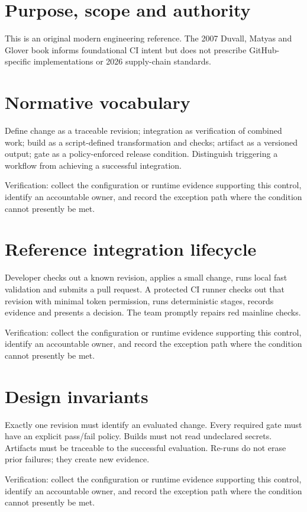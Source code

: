 \documentclass[11pt,letterpaper]{article}
\begin{document}
\makedoctitle
\makedocsummary
\tableofcontents
\clearpage
\section{Purpose, scope and authority}
This is an original modern engineering reference. The 2007 Duvall, Matyas and Glover book informs foundational CI intent but does not prescribe GitHub-specific implementations or 2026 supply-chain standards.

\section{Normative vocabulary}
Define change as a traceable revision; integration as verification of combined work; build as a script-defined transformation and checks; artifact as a versioned output; gate as a policy-enforced release condition. Distinguish triggering a workflow from achieving a successful integration.

Verification: collect the configuration or runtime evidence supporting this control, identify an accountable owner, and record the exception path where the condition cannot presently be met.

\section{Reference integration lifecycle}
Developer checks out a known revision, applies a small change, runs local fast validation and submits a pull request. A protected CI runner checks out that revision with minimal token permission, runs deterministic stages, records evidence and presents a decision. The team promptly repairs red mainline checks.

Verification: collect the configuration or runtime evidence supporting this control, identify an accountable owner, and record the exception path where the condition cannot presently be met.

\section{Design invariants}
Exactly one revision must identify an evaluated change. Every required gate must have an explicit pass/fail policy. Builds must not read undeclared secrets. Artifacts must be traceable to the successful evaluation. Re-runs do not erase prior failures; they create new evidence.

Verification: collect the configuration or runtime evidence supporting this control, identify an accountable owner, and record the exception path where the condition cannot presently be met.
\end{document}
